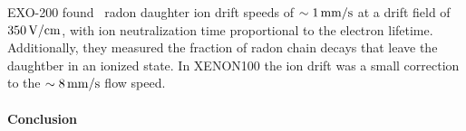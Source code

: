 EXO-200 found~\cite{Albert:2015vma} radon daughter ion drift speeds of $\sim 1\,\mathrm{mm/s}$ at a drift field of $350\,\mathrm{V/cm}$, with ion neutralization time proportional to the electron lifetime. Additionally, they measured the fraction of radon chain decays that leave the daughtber in an ionized state. In XENON100 the ion drift was a small correction to the $\sim 8\,\mathrm{mm/s}$ flow speed.

\paragraph{Conclusion}
